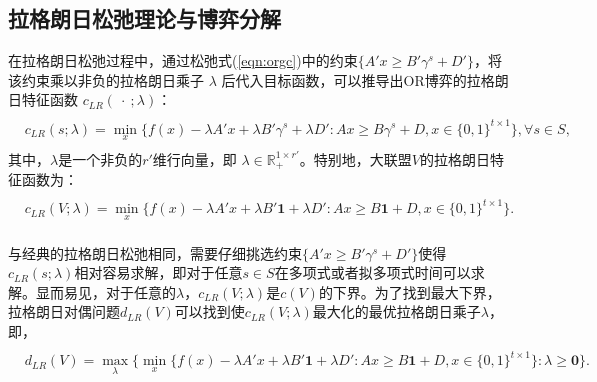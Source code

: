 \documentclass[UTF8]{article}
\newcommand{\R}{\mathbb{R}}
\begin{document}
    \subsection{拉格朗日松弛理论与博弈分解}\label{section:4_1}
    在拉格朗日松弛过程中，通过松弛式(\ref{eqn:orgc})中的约束$\{A'x \geq B'\gamma^s + D'\}$，将该约束乘以非负的拉格朗日乘子 $\lambda$ 后代入目标函数，可以推导出OR博弈的拉格朗日特征函数 $c_{LR}(\ \cdot\ ;\lambda)$：
    \begin{eqnarray}\label{eqn:lagrangianfunction}
    \begin{aligned}
    \begin{split}
    c_{LR}(s;\lambda) = \min_{x} \big\{ f(x)-\lambda A'x + \lambda B'\gamma^s + \lambda D':Ax \geq B \gamma^s + D, x \in \{0,1\}^{t \times 1} \big\}, \forall s \in S,
    \end{split}
    \end{aligned}
    \end{eqnarray}
    其中，$\lambda$是一个非负的$r'$维行向量，即 $\lambda \in \R_{+}^{1 \times r'}$。特别地，大联盟$V$的拉格朗日特征函数为：
    \begin{eqnarray*}\label{eqn:lagrangianfunctionN}
    \begin{aligned}
    \begin{split}
    c_{LR}(V;\lambda) = \min_{x} \big\{ f(x)-\lambda A'x + \lambda B'\textbf{1}+ \lambda D':Ax \geq B\textbf{1} + D, x \in \{0,1\}^{t \times 1} \big\}.
    \end{split}
    \end{aligned}
    \end{eqnarray*}

    与经典的拉格朗日松弛相同，需要仔细挑选约束$\{A'x \geq B'\gamma^s + D'\}$使得$c_{LR}(s;\lambda)$相对容易求解，即对于任意$s \in S$在多项式或者拟多项式时间可以求解。显而易见，对于任意的$\lambda$，$c_{LR}(V;\lambda)$是$c(V)$的下界。为了找到最大下界，拉格朗日对偶问题$d_{LR}(V)$可以找到使$c_{LR}(V;\lambda)$最大化的最优拉格朗日乘子$\lambda$，即，
    \begin{eqnarray}\label{eqn:lagrangianfunctionmax}
    \begin{aligned}
    \begin{split}
    d_{LR}(V) = \max_{\lambda} \big\{ \min_{x} \big\{ f(x)-\lambda A'x + \lambda B'\textbf{1} + \lambda D':Ax \geq B\textbf{1} + D, x \in \{0,1\}^{t \times 1} \big\}:\lambda \geq \textbf{0} \big\}.
    \end{split}
    \end{aligned}
    \end{eqnarray}
\end{document}
